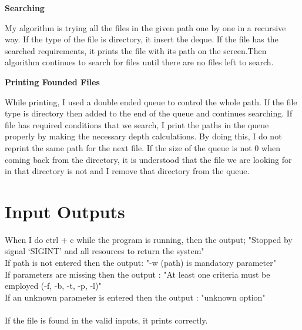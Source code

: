 \documentclass{article}
\begin{document}
\setlength{\parindent}{5ex}
\hspace{\parindent}\textbf{Searching}

\hspace{\parindent} My algorithm is trying all the files in the given path one by one in a recursive way. If the type of the file is directory, it insert  the deque. If the file has the searched requirements, it prints the file with its path on the screen.Then algorithm continues to search for files until there are no files left to search. \par

\setlength{\parindent}{5ex}
\hspace{}\textbf{Printing Founded Files}

\hspace{\parindent} While printing, I used a double ended queue to control the whole path. If the file type is directory then added to the end of the queue and continues searching. If  file has required conditions that we search, I print the paths in the queue properly by making the necessary depth calculations. By doing this, I do not reprint the same path for the next file. If the size of the queue is not 0 when coming back from the directory, it is understood that the file we are looking for in that directory is not and I remove that directory from the queue. \par

\section{Input Outputs}

\hspace{} When I do ctrl + c while the program is running, then the output;  "Stopped by signal `SIGINT' and all resources to return the system" \\
If path is not entered then the output: "-w (path) is mandatory parameter" \\
If parameters are missing then the output : "At least one criteria must be employed (-f, -b, -t, -p, -l)" \\
If an unknown parameter is entered then the output : "unknown option" \\ \\
If the file is found in the valid inputs, it prints correctly.
\par
\end{document}
